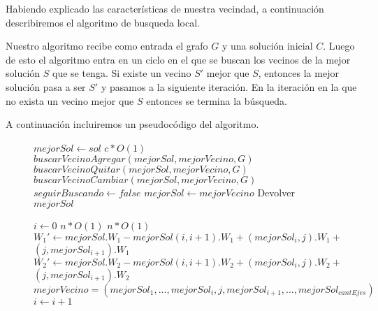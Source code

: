 Habiendo explicado las características de nuestra vecindad, a continuación describiremos el algoritmo de busqueda local.

Nuestro algoritmo recibe como entrada el grafo $G$ y una solución inicial $C$. Luego de esto el algoritmo entra en un ciclo en el que se buscan los vecinos de la mejor solución $S$ que se tenga. Si existe un vecino $S'$ mejor que $S$, entonces la mejor solución pasa a ser $S'$ y pasamos a la siguiente iteración. En la iteración en la que no exista un vecino mejor que $S$ entonces se termina la búsqueda.

A continuación incluiremos un pseudocódigo del algoritmo.
\begin{center}
 \begin{figure}[H]
  \begin{pseudo}
   \State $mejorSol \leftarrow sol$
   \hfill$c*O(1)$
      \State $buscarVecinoAgregar(mejorSol, mejorVecino, G)$
      \State $buscarVecinoQuitar(mejorSol, mejorVecino, G)$
      \State $buscarVecinoCambiar(mejorSol, mejorVecino, G)$
	\State $seguirBuscando \leftarrow false$
      \Else
	\State $mejorSol \leftarrow mejorVecino$
      \EndIf
   \EndWhile
   \State Devolver $mejorSol$
   \EndProcedure
  \end{pseudo}
 \end{figure}
\end{center}

\begin{flushleft}
 \begin{figure}[H]
  \begin{pseudo}
   \State $i \leftarrow 0$
   \hfill$n*O(1)$
      \hfill$n*O(1)$
	  \State $W_1' \leftarrow mejorSol.W_1 - mejorSol(i,i+1).W_1 + (mejorSol_i,j).W_1 + $
	  \State $(j,mejorSol_{i+1}).W_1$
	  \State $W_2' \leftarrow mejorSol.W_2 - mejorSol(i,i+1).W_2 + (mejorSol_i,j).W_2 + $
	  \State $(j,mejorSol_{i+1}).W_2$
	    \State $mejorVecino = (mejorSol_1, ... ,mejorSol_i, j, mejorSol_{i+1}, ..., mejorSol_{cantEjes})$
	  \EndIf
      \EndFor
      \State $i \leftarrow i+1$
   \EndWhile
   \EndProcedure
  \end{pseudo}
 \end{figure}
\end{flushleft}

